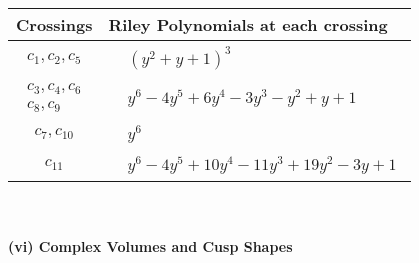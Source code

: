 \documentclass[1p]{elsarticle_modified}
\theoremstyle{definition}
\begin{document}
\begin{tabular}{m{50pt}|m{274pt}}
Crossings & \hspace{64pt}Riley Polynomials at each crossing \\
\hline $$\begin{aligned}c_{1},c_{2},c_{5}\end{aligned}$$&$\begin{aligned}
&(y^2+y+1)^3
\end{aligned}$\\
\hline $$\begin{aligned}c_{3},c_{4},c_{6}\\c_{8},c_{9}\end{aligned}$$&$\begin{aligned}
&y^6-4 y^5+6 y^4-3 y^3- y^2+y+1
\end{aligned}$\\
\hline $$\begin{aligned}c_{7},c_{10}\end{aligned}$$&$\begin{aligned}
&y^6
\end{aligned}$\\
\hline $$\begin{aligned}c_{11}\end{aligned}$$&$\begin{aligned}
&y^6-4 y^5+10 y^4-11 y^3+19 y^2-3 y+1
\end{aligned}$\\
\hline
\end{tabular}\\~\\
\newpage\flushleft \textbf{(vi) Complex Volumes and Cusp Shapes}
\end{document}
